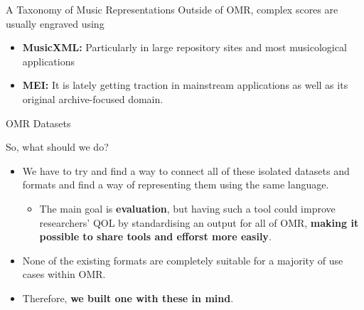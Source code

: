\documentclass[UKenglish, aspectratio = 169]{beamer}
\begin{document}
\begin{frame}[c]{A Taxonomy of Music Representations}
	Outside of OMR, complex scores are usually engraved using
	\begin{itemize}
		\item \textbf{MusicXML:} Particularly in large repository sites and most 
		musicological applications
		\item \textbf{MEI:} It is lately getting traction in mainstream applications as
		well as its original archive-focused domain.
	\end{itemize}
\end{frame}


\begin{frame}[c]{OMR Datasets}
	
\end{frame}


\begin{frame}[c]{So, what should we do?}
	\begin{itemize}
		\item We have to try and find a way to connect all of these isolated datasets
		and formats and find a way of representing them using the same language.
		\begin{itemize}
			\item The main goal is \textbf{evaluation}, but having such a tool could 
			improve researchers' QOL by standardising an output for all of OMR, 
			\textbf{making it possible to share tools and efforst more easily}.
		\end{itemize}
		
		\item None of the existing formats are completely suitable for a majority 
		of use cases within OMR.

		\item Therefore, \textbf{we built one with these in mind}.
	\end{itemize}		
\end{frame}

\end{document}

